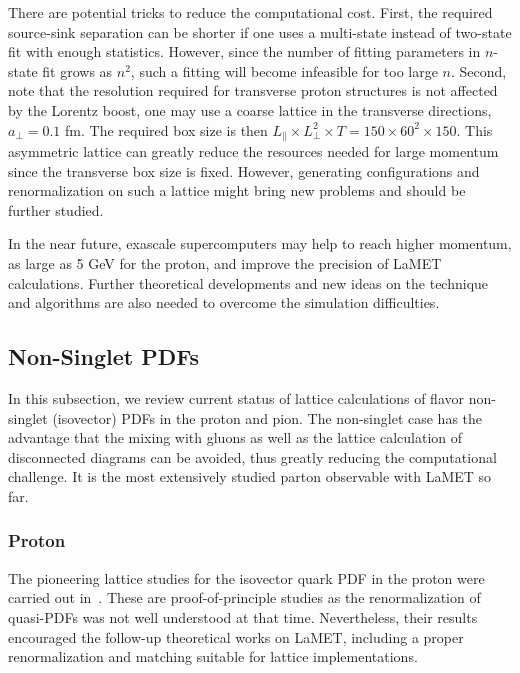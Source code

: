 \documentclass[aps,rmp,reprint,amsmath,amssymb,graphicx,longbibliography]{revtex4-1} %
\begin{document}
There are potential tricks to reduce the computational cost.
%
First, the required source-sink separation can be shorter if one uses a multi-state instead of two-state fit with enough statistics.
%
However, since the number of fitting parameters in $n$-state fit grows as $n^2$, such a fitting will become infeasible for too large $n$.
%
Second, note that the resolution required for transverse proton structures is not affected by the Lorentz boost, one may use a coarse lattice in the transverse directions, $a_\perp=0.1$ fm.
%
The required box size is then $L_\parallel\times L_\perp^2\times T=150\times 60^2\times 150$.
%
This asymmetric lattice can greatly reduce the resources needed for large momentum since the transverse box size is fixed.
%
However, generating configurations and renormalization on such a lattice might bring new problems and should be further studied.

In the near future, exascale supercomputers may help to reach higher momentum, as large as 5 GeV for the proton,
and improve the precision of LaMET calculations. Further theoretical developments and new ideas on the technique and algorithms are also needed to overcome the simulation difficulties.


\subsection{Non-Singlet PDFs}
\label{sec:lattice-pdf}

In this subsection, we review current status of lattice calculations of flavor non-singlet (isovector) PDFs in the proton and
pion.
%
The non-singlet case has the advantage that the mixing with gluons as well as the lattice calculation of disconnected diagrams can be avoided, thus greatly reducing the computational challenge. It is the most extensively studied parton observable with LaMET so far.

\subsubsection{Proton}
\label{sec:lattice-pdf-proton}

The pioneering lattice studies for the isovector quark PDF in the proton were carried out in~\cite{Lin:2014zya,Alexandrou:2015rja}.
These are proof-of-principle studies as the renormalization of quasi-PDFs was not well understood at that time. Nevertheless, their results encouraged the follow-up theoretical works on LaMET, including a proper renormalization and matching suitable for lattice implementations.
\end{document}
